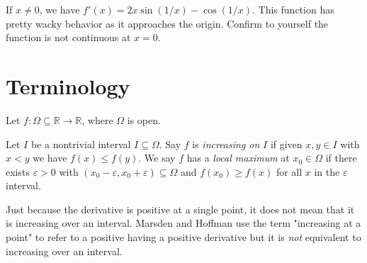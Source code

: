 \documentclass[11pt]{article}
\theoremstyle{definition}
\newcommand{\R}{\mathbb{R}}                      %
\begin{document}
If $x\neq 0$, we have $f'(x)=2x\sin(1/x)-\cos(1/x)$. This function has pretty wacky behavior as it approaches the origin. Confirm to yourself the function is not continuous at $x=0$.

\section{Terminology}
Let $f:\Omega\subseteq \R\to \R$, where $\Omega$ is open. 

 Let $I$ be a nontrivial interval $I\subseteq \Omega$. Say $f$ is \textit{increasing on} $I$ if given $x,y\in I$ with $x<y$ we have $f(x)\leq f(y)$. We say $f$ has a \textit{local maximum} at $x_0\in\Omega$ if there exists $\varepsilon>0$ with $(x_0-\varepsilon,x_0+\varepsilon)\subseteq \Omega$ and $f(x_0)\geq f(x)$ for all $x$ in the $\varepsilon$ interval.

\note Just because the derivative is positive at a single point, it does not mean that it is increasing over an interval. Marsden and Hoffman use the term "increasing at a point" to refer to a positive having a positive derivative but it is \textit{not} equivalent to increasing over an interval.
\end{document}

